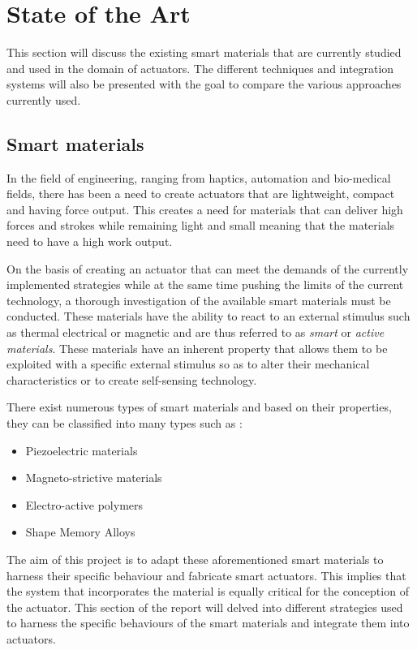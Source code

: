 \section{State of the Art} \label{sec:sota}
This section will discuss the existing smart materials that are currently studied and used in the domain of actuators. The different techniques and integration systems will also be presented with the goal to compare the various approaches currently used.

\subsection{Smart materials} \label{subsec:Smartmaterials}
In the field of engineering, ranging from haptics, automation and bio-medical fields, there has been a need  to create actuators that are lightweight, compact and having force output. This creates a need for materials that can deliver high forces and strokes while remaining light and small meaning that the materials need to have a high work output.

On the basis of creating an actuator that can meet the demands of the currently implemented strategies while at the same time pushing the limits of the current technology, a thorough investigation of the available smart materials must be conducted. These materials have the ability to react to an external stimulus such as thermal electrical or magnetic and are thus referred to as \emph{smart} or \emph{active materials}. These materials have an inherent property that allows them to be exploited with a specific external stimulus so as to alter their mechanical characteristics or to create self-sensing technology.

There exist numerous types of smart materials and based on their properties, they can be classified into many types such as \cite{damodharan_review_2018}:
\begin{itemize}
	\item Piezoelectric materials
	\item Magneto-strictive materials
	\item Electro-active polymers
	\item Shape Memory Alloys
\end{itemize}

The aim of this project is to adapt these aforementioned smart materials to harness their specific behaviour and fabricate smart actuators. This implies that the system that incorporates the material is equally critical for the conception of the actuator. This section of the report will delved into different strategies used to harness the specific behaviours of the smart materials and integrate them into actuators.

